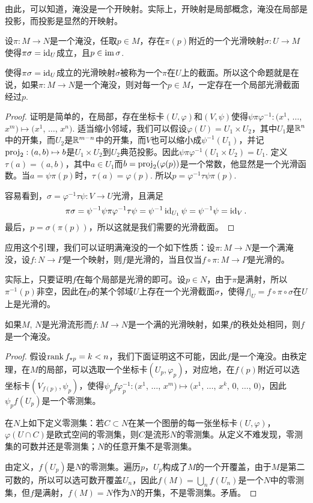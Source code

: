 由此，可以知道，淹没是一个开映射。实际上，开映射是局部概念，淹没在局部是投影，而投影是显然的开映射。

\begin{lem}\label{lem:2.9}
设$\pi:M\to N$是一个淹没，任取$p\in M$，存在$\pi(p)$附近的一个光滑映射$\sigma:U\to M$使得$\pi\sigma=\operatorname{id}_U$成立，且$p\in\operatorname{im} \sigma$. 
\end{lem}

使得$\pi\sigma=\operatorname{id}_U$成立的光滑映射$\sigma$被称为一个$\pi$在$U$上的截面。所以这个命题就是在说，如果$\pi:M\to N$是一个淹没，则对每一个$p\in M$，一定存在一个局部光滑截面经过$p$.

\begin{proof}
	证明是简单的，在局部，存在坐标卡$(U,\varphi)$和$(V,\psi)$使得$\psi\pi\varphi^{-1}:(x^1$, $\dots$, $x^m)\mapsto (x^1$, $\dots$, $x^n)$. 适当缩小邻域，我们可以假设$\varphi(U)=U_1\times U_2$，其中$U_1$是$\mathbb{R}^n$中的开集，而$U_2$是$\mathbb{R}^{m-n}$中的开集，而$V$也可以缩小成$\psi^{-1}(U_1)$，并记$\operatorname{proj}_2:(a,b)\mapsto b$是$U_1\times U_2$到$U_2$典范投影。因此$\psi\pi\varphi^{-1}(U_1\times U_2)=U_1$. 定义$\tau(a)=(a,b)$，其中$a\in U_1$而$b=\operatorname{proj}_2(\varphi(p))$是一个常数，他显然是一个光滑函数。当$a=\psi\pi(p)$时，$\tau(a)=\varphi(p)$. 所以$p=\varphi^{-1}\tau \psi\pi(p)$. 

	容易看到，$\sigma = \varphi^{-1} \tau \psi : V\to U$光滑，且满足
	\[
	\pi \sigma = \psi^{-1} \psi \pi \varphi^{-1} \tau \psi= \psi^{-1}\operatorname{id}_{U_1} \psi = \psi^{-1}\psi=\operatorname{id}_{V}.
	\]
	最后，$p=\sigma(\pi(p))$，所以这就是我们需要的光滑截面。
\end{proof}

应用这个引理，我们可以证明满淹没的一个如下性质：设$\pi :M\to N$是一个满淹没，设$f:N\to P$是一个映射，则$f$是光滑的，当且仅当$f\circ \pi:M\to P$是光滑的。

实际上，只要证明$f$在每个局部是光滑的即可。设$p\in N$，由于$\pi$是满射，所以$\pi^{-1}(p)$非空，因此在$p$的某个邻域$U$上存在一个光滑截面$\sigma$，使得$f|_U=f\circ \pi\circ \sigma$在$U$上是光滑的。

\begin{pro}\label{pro:surrank}
如果$M$, $N$是光滑流形而$f:M\to N$是一个满的光滑映射，如果$f$的秩处处相同，则$f$是一个淹没。
\end{pro}

\begin{proof}
	假设$\operatorname{rank} f_{*p}=k< n$，我们下面证明这不可能，因此$f$是一个淹没。由秩定理，在$M$的局部，可以选取一个坐标卡$(U_p,\varphi_p)$，对应地，在$f(p)$附近可以选坐标卡$(V_{f(p)},\psi_p)$，使得$\psi_p f\varphi^{-1}_p:(x^1$, $\dots$, $x^m)\mapsto (x^1$, $\dots$, $x^k$, $0$, $\dots$, $0)$，因此$\psi_p f(U_p)$是一个零测集。

	在$N$上如下定义零测集：若$C\subset N$在某一个图册的每一张坐标卡$(U,\varphi)$，$\varphi(U\cap C)$是欧式空间的零测集，则$C$是流形$N$的零测集。从定义不难发现，零测集的可数并还是零测集；$N$的任意开集不是零测集。

	由定义，$f(U_p)$是$N$的零测集。遍历$p$，$U_p$构成了$M$的一个开覆盖，由于$M$是第二可数的，所以可以选可数开覆盖$U_n$，因此$f(M)=\bigcup_n f(U_n)$是一个$N$中的零测集，但$f$是满射，$f(M)=N$作为$N$的开集，不是零测集。矛盾。
\end{proof}

